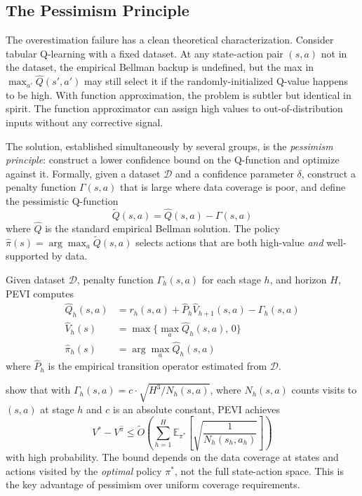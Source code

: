 \subsection{The Pessimism Principle}
\label{sec:pessimism}

The overestimation failure has a clean theoretical characterization. Consider tabular Q-learning with a fixed dataset. At any state-action pair $(s, a)$ not in the dataset, the empirical Bellman backup is undefined, but the max in $\max_{a'} \hat{Q}(s', a')$ may still select it if the randomly-initialized Q-value happens to be high. With function approximation, the problem is subtler but identical in spirit. The function approximator can assign high values to out-of-distribution inputs without any corrective signal.

The solution, established simultaneously by several groups, is the \textit{pessimism principle}: construct a lower confidence bound on the Q-function and optimize against it. Formally, given a dataset $\mathcal{D}$ and a confidence parameter $\delta$, construct a penalty function $\Gamma(s, a)$ that is large where data coverage is poor, and define the pessimistic Q-function
\begin{equation}
\label{eq:pessimistic_q}
\tilde{Q}(s, a) = \hat{Q}(s, a) - \Gamma(s, a)
\end{equation}
where $\hat{Q}$ is the standard empirical Bellman solution. The policy $\hat{\pi}(s) = \arg\max_a \tilde{Q}(s, a)$ selects actions that are both high-value \textit{and} well-supported by data.

\begin{definition}
\label{def:pevi}
Given dataset $\mathcal{D}$, penalty function $\Gamma_h(s,a)$ for each stage $h$, and horizon $H$, PEVI computes
\begin{align}
\hat{Q}_h(s,a) &= r_h(s,a) + \hat{P}_h \hat{V}_{h+1}(s,a) - \Gamma_h(s,a) \\
\hat{V}_h(s) &= \max\{\max_a \hat{Q}_h(s,a), \, 0\} \\
\hat{\pi}_h(s) &= \arg\max_a \hat{Q}_h(s,a)
\end{align}
where $\hat{P}_h$ is the empirical transition operator estimated from $\mathcal{D}$.
\end{definition}

\citet{JinYang2021} show that with $\Gamma_h(s,a) = c \cdot \sqrt{H^3 / N_h(s,a)}$, where $N_h(s,a)$ counts visits to $(s,a)$ at stage $h$ and $c$ is an absolute constant, PEVI achieves
\begin{equation}
\label{eq:pevi_bound}
V^* - V^{\hat{\pi}} \leq \tilde{O}\left(\sum_{h=1}^H \mathbb{E}_{\pi^*}\left[\sqrt{\frac{1}{N_h(s_h, a_h)}}\right]\right)
\end{equation}
with high probability. The bound depends on the data coverage at states and actions visited by the \textit{optimal} policy $\pi^*$, not the full state-action space. This is the key advantage of pessimism over uniform coverage requirements.

